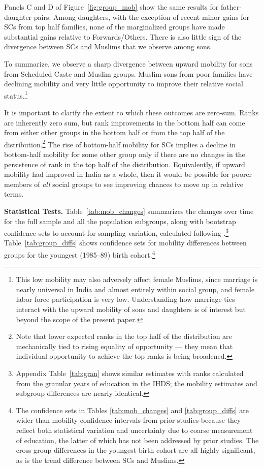 \documentclass[12pt,letterpaper]{article}
\numberwithin{equation}{section}
\begin{document}
Panels C and D of Figure~\ref{fig:group_mob} show the same results for father-daughter pairs. Among daughters, with the exception of recent minor gains for SCs from top half families, none of the marginalized groups have made substantial gains relative to Forwards/Others. There is also little sign of the divergence between SCs and Muslims that we observe among sons. 

To summarize, we observe a sharp divergence between upward mobility for sons from Scheduled Caste and Muslim groups. Muslim sons from poor families have declining mobility and very little opportunity to improve their relative social status.\footnote{This low mobility may also adversely affect female Muslims, since marriage is nearly universal in India and almost entirely within social group, and female labor force participation is very low. Understanding how marriage ties interact with the upward mobility of sons and daughters is of interest but beyond the scope of the present paper.}

It is important to clarify the extent to which these outcomes are zero-sum. Ranks are inherently zero sum, but rank improvements in the bottom half can come from either other groups in the bottom half or from the top half of the distribution.\footnote{Note that lower expected ranks in the top half of the distribution are mechanically tied to rising equality of opportunity --- they mean that individual opportunity to achieve the top ranks is being broadened.} The rise of bottom-half mobility for SCs implies a decline in bottom-half mobility for some other group only if there are no changes in the persistence of rank in the top half of the distribution. Equivalently, if upward mobility had improved in India as a whole, then it would be possible for poorer members of \textit{all} social groups to see improving chances to move up in relative terms.

\textbf{Statistical Tests.} Table~\ref{tab:mob_changes} summarizes the changes over time for the full sample and all the population subgroups, along with bootstrap confidence sets to account for sampling variation, calculated following .\footnote{Appendix Table~\ref{tab:gran} shows similar estimates with ranks calculated from the granular years of education in the IHDS; the mobility estimates and subgroup differences are nearly identical.} Table~\ref{tab:group_diffs} shows confidence sets for mobility differences between groups for the youngest (1985--89) birth cohort.\footnote{The confidence sets in Tables \ref{tab:mob_changes} and \ref{tab:group_diffs} are wider than mobility confidence intervals from prior studies because they reflect both statistical variation and uncertainty due to coarse measurement of education, the latter of which has not been addressed by prior studies. The cross-group differences in the youngest birth cohort are all highly significant, as is the trend difference between SCs and Muslims.}
\end{document}
